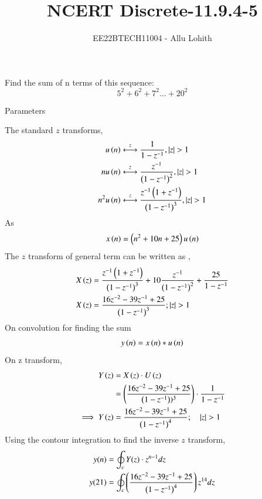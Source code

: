 \documentclass[journal,12pt,twocolumn]{IEEEtran}
\theoremstyle{remark}
\begin{document}

\vspace{3cm}

\title{NCERT Discrete-11.9.4-5}
\author{EE22BTECH11004 - Allu Lohith}

\maketitle
\newpage
\bigskip


 Find the sum of n terms of this sequence:$$5^2+6^2+7^2...+20^2$$  
\solution
\fi
\begin{table}[h!]
\centering

\vspace{0.5cm}
\caption{\normalsize Parameters}
\end{table}
The standard $z$ transforms,
\begin{align}
    u \left(n\right) &\stackrel{z}{\longleftrightarrow} \frac{1}{1-z^{-1}}, \left\vert z\right\vert >1\\
   n u\left(n\right) &\stackrel{z}{\longleftrightarrow} \frac{z^{-1}}{\left(1-z^{-1}\right)^2}, \left\vert z\right\vert >1\\
   n^2 u\left(n\right) &\stackrel{z}{\longleftrightarrow} \frac{z^{-1}\left(1+z^{-1}\right)}{\left(1-z^{-1}\right)^3}, \left\vert z\right\vert >1
\end{align}
As 
\begin{align}
    x\left(n\right) = \left(n^2+10n+25\right)u\left(n\right)
\end{align}
The $z$ transform of general term can be written as , 
\begin{align}
    X\left(z\right) &= \frac{z^{-1}\left(1+z^{-1}\right)}{\left(1-z^{-1}\right)^3}+10\frac{z^{-1}}{\left(1-z^{-1}\right)^2}+\frac{25}{1-z^{-1}} \\
    X\left(z\right) &=  \frac{16z^{-2}-39z^{-1}+25}{\left(1-z^{-1}\right)^3}; \left\vert z\right\vert>1
\end{align}
On convolution for finding the sum
\begin{align}
    y\left(n\right)= x\left(n\right) \ast u\left(n\right)
\end{align}
On z transform,
\begin{align}
    Y\left(z\right) &= X \left(z\right) \cdot U \left(z\right)\\
    &= \left(\frac{16z^{-2}-39z^{-1}+25}{\left(1-z^{-1}\right))^3}\right) \cdot \frac{1}{1-z^{-1}}\\
    \implies 
    Y \left(z\right) & = \frac{16z^{-2}-39z^{-1}+25}{\left(1-z^{-1}\right)^4}; \quad \left\vert z\right\vert >1
\end{align}
Using the contour integration to find the inverse $z$ transform,
\begin{align}
    y(n)&=\oint_c Y(z)\cdot z^{n-1}dz\\
    y(21)&=\oint_c \left(\frac{16z^{-2}-39z^{-1}+25}{\left(1-z^{-1}\right)^4}\right) z^{14}dz
\end{align}
\end{document}
